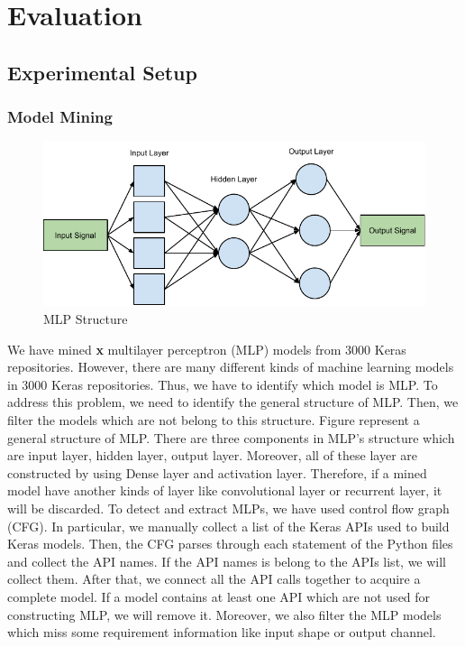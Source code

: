 \section{Evaluation}
\label{sec:evaluation}
\subsection{Experimental Setup}
\subsubsection{\textbf{Model Mining}}
\begin{figure}
	\includegraphics[width=0.8\linewidth]{mlp}
	\centering
	\caption{MLP Structure}
	\label{fig:mlp}
\end{figure}
We have mined {\bf x} multilayer perceptron (MLP) models from 3000 Keras repositories. However, there are many different kinds of machine learning models in 3000 Keras repositories. Thus, we have to identify which model is MLP. To address this problem, we need to identify the general structure of MLP. Then, we filter the models which are not belong to this structure. Figure  represent a general structure of MLP. There are three components in MLP's structure which are input layer, hidden layer, output layer. Moreover, all of these layer are constructed by using Dense layer and activation layer. Therefore, if a mined model have another kinds of layer like convolutional layer or recurrent layer, it will be discarded. To detect and extract MLPs, we have used control flow graph (CFG). In particular, we manually collect a list of the Keras APIs used to build Keras models. Then, the CFG parses through each statement of the Python files and collect the API names. If the API names is belong to the APIs list, we will collect them. After that, we connect all the API calls together to acquire a complete model. If a model contains at least one API which are not used for constructing MLP, we will remove it. Moreover, we also filter the MLP models which miss some requirement information like input shape or output channel.
